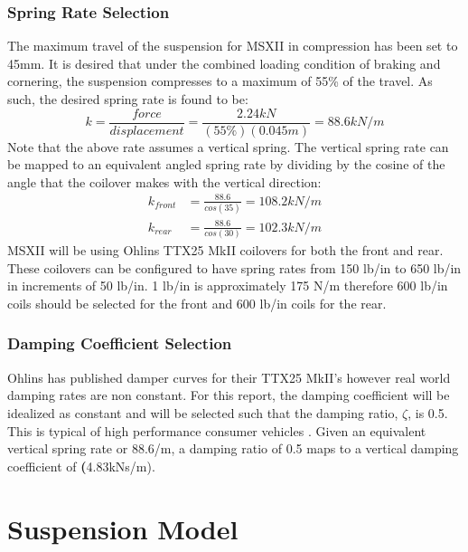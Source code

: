 \documentclass[12pt]{article}
\begin{document}
\subsubsection{Spring Rate Selection}
The maximum travel of the suspension for MSXII in compression has been set to 45mm. It is desired that under the combined loading condition of braking and cornering, the suspension compresses to a maximum of 55\% of the travel. As such, the desired spring rate is found to be: 
\begin{equation}
	k = \frac{force}{displacement} = \frac{2.24kN}{(55\%)(0.045m)} = 88.6kN/m
\end{equation}
Note that the above rate assumes a vertical spring. The vertical spring rate can be mapped to an equivalent angled spring rate by dividing by the cosine of the angle that the coilover makes with the vertical direction: 
\begin{equation}
	\begin{split}
		k_{front} &= \frac{88.6}{cos(35)} = 108.2kN/m \\
		k_{rear} &= \frac{88.6}{cos(30)} = 102.3kN/m
	\end{split}
\end{equation}
MSXII will be using Ohlins TTX25 MkII coilovers for both the front and rear. These coilovers can be configured to have spring rates from 150 lb/in to 650 lb/in in increments of 50 lb/in. 1 lb/in is approximately 175 N/m therefore 600 lb/in coils should be selected for the front and 600 lb/in coils for the rear. 

\subsubsection{Damping Coefficient Selection}
Ohlins has published damper curves for their TTX25 MkII's however real world damping rates are non constant. For this report, the damping coefficient will be idealized as constant and will be selected such that the damping ratio, $\zeta$, is 0.5. This is typical of high performance consumer vehicles \cite{dampers}. Given an equivalent vertical spring rate or 88.6/m, a damping ratio of 0.5 maps to a vertical damping coefficient of \textbf(4.83kNs/m). 

\section{Suspension Model}
\end{document}
